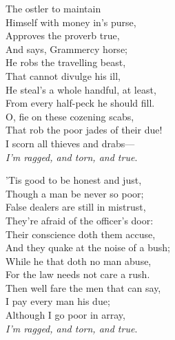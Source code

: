 \begin{dcverse}
\begin{altverse}
The ostler to maintain\\
Himself with money in’s purse,\\
Approves the proverb true,\\
And says, Grammercy horse;\\
He robs the travelling beast,\\
That cannot divulge his ill,\\
He steal's a whole handful, at least,\\
From every half-peck he should fill.\\
O, fie on these cozening scabs,\\
That rob the poor jades of their due!\\
I scorn all thieves and drabs—\\
\textit{I’m ragged, and torn, and true}.
\end{altverse}

\begin{altverse}
’Tis good to be honest and just,\\
Though a man be never so poor;\\
False dealers are still in mistrust,\\
They’re afraid of the officer’s door:\\
Their conscience doth them accuse,\\
And they quake at the noise of a bush;\\
While he that doth no man abuse,\\
For the law needs not care a rush.\\
Then well fare the men that can say,\\
I pay every man his due;\\
Although I go poor in array,\\
\textit{I’m ragged, and torn, and true}.
\end{altverse}

\end{dcverse}
\pagebreak

